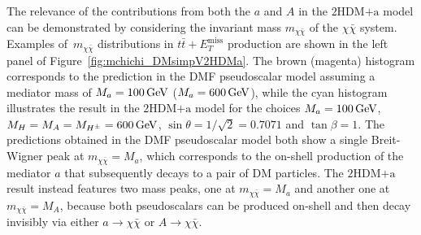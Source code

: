 \documentclass[a4paper, 11pt,notoc]{article}
\newcommand{\MET}{\ensuremath{E_T^\mathrm{miss}}\xspace}
\newcommand{\mA}{\ensuremath{M_{A}}\xspace}
\newcommand{\ma}{\ensuremath{M_{a}}\xspace}
\newcommand{\mH}{\ensuremath{M_{H}}\xspace}
\newcommand{\mHc}{\ensuremath{M_{H^{\pm}}}\xspace}
\newcommand{\hdma}{\ensuremath{\textrm{2HDM+a}}\xspace}
\begin{document}
 The relevance of the contributions from both the $a$ and $A$ in the \hdma model can be  demonstrated by considering the invariant mass $m_{\chi \bar \chi}$ of the $\chi \bar \chi$ system. Examples of~$m_{\chi \bar \chi}$ distributions in $t \bar t + \MET$ production are shown in the left panel of Figure~\ref{fig:mchichi_DMsimpV2HDMa}. The brown (magenta) histogram corresponds to the prediction in the DMF pseudoscalar model assuming a mediator mass of $\ma =100 \, {\rm  GeV}$ ($\ma =600 \, {\rm  GeV}$), while the cyan histogram illustrates the result in the \hdma model for the choices $\ma = 100 \, {\rm  GeV}$, $\mH = \mA = \mHc = 600 \, {\rm  GeV}$, $\sin\theta=1/\sqrt{2}=0.7071$ and $\tan\beta=1$. The predictions obtained in the  DMF pseudoscalar model both show a single  Breit-Wigner  peak  at $m_{\chi \bar \chi} = \ma$, which corresponds to the on-shell production of the mediator $a$ that subsequently decays to a pair of DM particles. The \hdma result instead features two mass peaks, one at $m_{\chi \bar \chi} = \ma$ and another one at $m_{\chi \bar \chi} = \mA$, because both pseudoscalars can be produced on-shell and then decay invisibly via either $a \to \chi \bar \chi$ or $A \to \chi \bar \chi$.  
\end{document}
